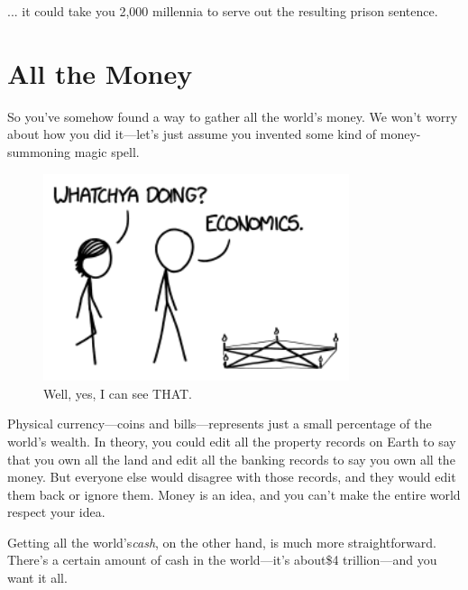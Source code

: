 {{... it could take you 2,000 millennia to serve out the resulting prison sentence.}

{
\chapter{All the Money}
}

\hfill{}

{So you've somehow found a way to gather all the world's money. We won't worry about how you did it—let's just assume you invented some kind of money-summoning magic spell.}

\begin{figure}[!htbp]
\centering
\includegraphics[scale=0.5, max width=0.8\textwidth]{imgs/a/111/summon.png}
\caption{Well, yes, I can see THAT.}
\end{figure}

{Physical currency—coins and bills—represents just a small percentage of the world's wealth. In theory, you could edit all the property records on Earth to say that you own all the land and edit all the banking records to say you own all the money. But everyone else would disagree with those records, and they would edit them back or ignore them. Money is an idea, and you can't make the entire world respect your idea.}

{Getting all the world's\emph{cash}, on the other hand, is much more straightforward. There's a certain amount of cash in the world—it's about\$4 trillion—and you want it all.}

}

